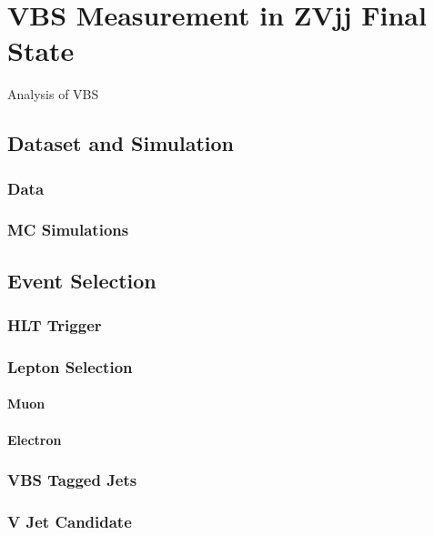 \chapter{
  VBS Measurement in ZVjj Final State
 }\label{ch_vbs}

Analysis of \gls{VBS}

\section{
  Dataset and Simulation
 }

\subsection{
  Data
}

\subsection{
  MC Simulations
}

\section{
  Event Selection
 }

\subsection{
  HLT Trigger
}

\subsection{
  Lepton Selection
}

\subsubsection{
  Muon
}

\subsubsection{
  Electron
}

\subsection{
  VBS Tagged Jets
}

\subsection{
  V Jet Candidate
}
